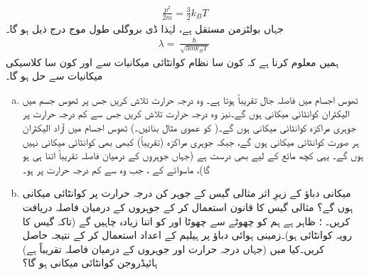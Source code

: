 \begin{align*}
\frac{ p^2 }{ 2 m } = \frac{ 3 }{ 2 } k_B T
\end{align*}
جہاں  بولٹزمن مستقل ہے، لہٰذا ڈی بروگلی طول موج درج ذیل ہو گا۔
\begin{align*}
\lambda = \frac{ \hslash }{ \sqrt{ 3 m k_B T } }
\end{align*}
ہمیں معلوم کرنا ہے کہ کون سا نظام کوانٹائی میکانیات سے  اور کون سا کلاسیکی میکانیات سے حل ہو گا۔ 
\begin{enumerate}[a.]
\item
{}\quad
 ٹھوس اجسام میں  فاصلہ جال  تقریباً  ہوتا ہے۔ وہ درجہ حرارت تلاش کریں جس پر ٹھوس جسم میں  الیکٹران کوانٹائی میکانی ہوں گے۔نیز وہ درجہ حرارت تلاش کریں جس سے کم درجہ حرارت پر جوہری مراکزہ کوانٹائی میکانی ہوں گے۔(  کو عموی  مثال بنائیں۔) \quad 
ٹھوس اجسام میں آزاد الیکٹران ہر صورت کوانٹائی میکانی ہوں گے، جبکہ جوہری مراکزہ (تقریباً) کبھی بھی کوانٹائی میکانی نہیں ہوں گے۔ یہی کچھ مائع کے لیے بھی درست ہے (جہاں جوہروں کے درمیان  فاصلہ تقریباً  اتنا ہی ہو گا)،   ماسوائے  کے ، جب وہ   سے کم درجہ حرارت پر ہو۔
\item
{}  \quad
میکانی دباؤ   کے زیرِ اثر    مثالی  گیس کے جوہر  کن درجہ حرارت پر کوانٹائی میکانی ہوں گے؟  \quad
مثالی گیس کا  قانون  استعمال کر کے جوہروں کے درمیان فاصلہ دریافت کریں۔ \quad
{}؛  ظاہر ہے ہم  کو چھوٹے سے چھوٹا اور  کو اتنا زیادہ چاہیں گے (تاکہ گیس کا رویہ کوانٹائی ہو)۔زمینی ہوائی دباؤ پر ہیلیم کے اعداد استعمال کر کے نتیجہ حاصل کریں۔کیا  میں (جہاں درجہ حرارت  اور جوہروں کے درمیان فاصلہ تقریباً  ہے)  ہائیڈروجن کوانٹائی میکانی ہو گا؟ 
\end{enumerate}
